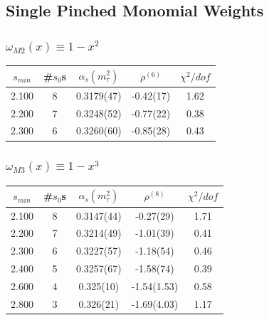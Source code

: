 \documentclass{beamer}
\begin{document}
\subsection{Single Pinched Monomial Weights}
\begin{frame}
  \frametitle{\(\omega_{M2}(x) \equiv 1-x^2\)}
  \centering
  \begin{tabular}{ccccc}
    \toprule
    \(s_{min}\) & \#\(s_0\)s & \(\alpha_s(m_\tau^2)\) & \(\rho^{(6)}\) &  \(\chi^2/dof\)  \\
    \midrule
    2.100 & 8 & 0.3179(47) & -0.42(17) & 1.62 \\
    \rowcolor{primary}
    2.200 & 7 & 0.3248(52) & -0.77(22) & 0.38 \\
    2.300 & 6 & 0.3260(60) & -0.85(28) & 0.43 \\
    \bottomrule
  \end{tabular}
\end{frame}
\begin{frame}
  \frametitle{\(\omega_{M3}(x) \equiv 1-x^3\)}
  \centering
  \begin{tabular}{ccccc}
    \toprule
    \(s_{min}\) & \#\(s_0\)s & \(\alpha_s(m_\tau^2)\) & \(\rho^{(8)}\) &  \(\chi^2/dof\)  \\
    \midrule
    2.100 & 8 & 0.3147(44) & -0.27(29) & 1.71 \\
    \rowcolor{primary}
    2.200 & 7  & 0.3214(49) & -1.01(39) & 0.41 \\
    2.300 & 6  & 0.3227(57) & -1.18(54) & 0.46 \\
    2.400 & 5  & 0.3257(67) & -1.58(74) & 0.39 \\
    2.600 & 4  & 0.325(10) & -1.54(1.53) & 0.58 \\
    2.800 & 3  & 0.326(21) & -1.69(4.03) & 1.17 \\
    \bottomrule
  \end{tabular}
\end{frame}
\end{document}
